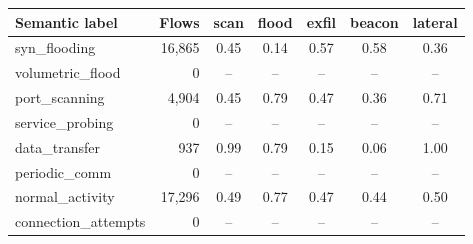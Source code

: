 \begin{tabular}{l r ccccc}
\toprule
Semantic label & Flows & scan & flood & exfil & beacon & lateral \\
\midrule
syn\_flooding & 16,865 & 0.45 & 0.14 & 0.57 & 0.58 & 0.36 \\
volumetric\_flood & 0 & -- & -- & -- & -- & -- \\
port\_scanning & 4,904 & 0.45 & 0.79 & 0.47 & 0.36 & 0.71 \\
service\_probing & 0 & -- & -- & -- & -- & -- \\
data\_transfer & 937 & 0.99 & 0.79 & 0.15 & 0.06 & 1.00 \\
periodic\_comm & 0 & -- & -- & -- & -- & -- \\
normal\_activity & 17,296 & 0.49 & 0.77 & 0.47 & 0.44 & 0.50 \\
connection\_attempts & 0 & -- & -- & -- & -- & -- \\
\bottomrule
\end{tabular}
